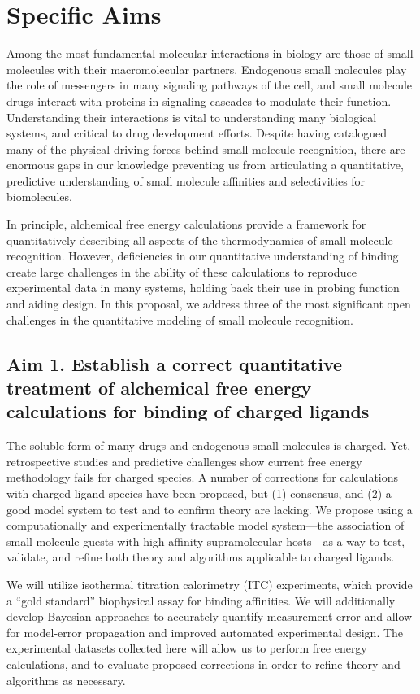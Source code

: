\documentclass[10pt]{article}
\date{}
\begin{document}
\section*{\centering Specific Aims}
Among the most fundamental molecular interactions in biology are those of small molecules with their macromolecular partners.
Endogenous small molecules play the role of messengers in many signaling pathways of the cell, and small molecule drugs interact with proteins in signaling cascades to modulate their function.
Understanding their interactions is vital to understanding many biological systems, and critical to drug development efforts. 
Despite having catalogued many of the physical driving forces behind small molecule recognition, there are enormous gaps in our knowledge preventing us from articulating a quantitative, predictive understanding of small molecule affinities and selectivities for biomolecules.

In principle, alchemical free energy calculations provide a framework for quantitatively describing all aspects of the thermodynamics of small molecule recognition. However, deficiencies in our quantitative understanding of binding create large challenges in the ability of these calculations to reproduce experimental data in many systems, holding back their use in probing function and aiding design.
In this proposal, we address three of the most significant open challenges in the quantitative modeling of small molecule recognition.


\subsection*{Aim 1. Establish a correct quantitative treatment of alchemical free energy calculations for binding of charged ligands}
The soluble form of many drugs and endogenous small molecules is charged. 
Yet, retrospective studies and predictive challenges show current free energy methodology fails for charged species\cite{Rocklin2013b,Muddana2014a}. 
A number of corrections for calculations with charged ligand species have been proposed, but (1) consensus, and (2) a good model system to test and to confirm theory are lacking. 
We propose using a computationally and experimentally tractable model system---the association of small-molecule guests with high-affinity supramolecular hosts---as a way to test, validate, and refine both theory and algorithms applicable to charged ligands.

We will utilize isothermal titration calorimetry (ITC) experiments, which provide a “gold standard” biophysical assay for binding affinities. 
We will additionally develop Bayesian approaches to accurately quantify measurement error and allow for model-error propagation and improved automated experimental design. 
The experimental datasets collected here will allow us to perform free energy calculations, and to evaluate proposed corrections in order to refine theory and algorithms as necessary. 
\end{document}
